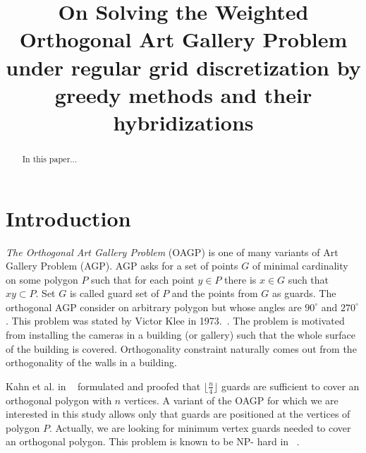 \documentclass[runningheads,a4paper]{elsarticle}
\begin{document}

    \title{On Solving the Weighted Orthogonal Art Gallery Problem under regular grid discretization by greedy methods and their hybridizations}


    \begin{abstract}
    In this paper...
    \end{abstract}
    \maketitle


    \section{Introduction}\label{sec:introduction}
     \emph{The Orthogonal Art Gallery Problem} (OAGP) is one of many variants of Art Gallery Problem (AGP). AGP asks for a set of points $G$ of minimal cardinality on some polygon $P$ such that for each point $y \in P$ there is $x \in G$ such that $xy \subset P$.  Set $G$ is called guard set of $P$ and the points from $G$ as guards. The orthogonal AGP consider on arbitrary polygon but whose angles are $90^{\circ}$ and $270^{\circ}$. This problem was stated by Victor  Klee in 1973.~\cite{o1987art}. The problem is motivated from installing the cameras in a building (or gallery) such that the whole surface of the building is covered. Orthogonality constraint naturally comes out from the orthogonality of the walls in a building.

     Kahn et al. in ~\cite{kahn1983traditional} formulated and proofed that 	$\lfloor \frac{n}{4} \rfloor$ guards are  sufficient to cover an orthogonal polygon with $n$ vertices.  A variant of the OAGP for which we are interested in this study allows only that guards are positioned at the vertices of polygon $P$. Actually, we are looking for minimum vertex guards needed to cover an orthogonal polygon. This problem is known to be NP- hard in ~\cite{schuchardt1995two,katz2008guarding}.
\end{document}
